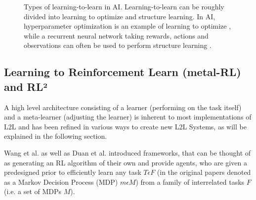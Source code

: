 \documentclass[letterpaper, 10 pt, conference]{ieeeconf}  %
\begin{document}
\begin{figure}[thpb]
        \centering
  \caption{Types of learning-to-learn in AI. Learning-to-learn can be roughly divided into learning to optimize and structure learning.
  In AI, hyperparameter optimization is
  an example of learning to optimize \cite{maclaurinGradientbasedHyperparameterOptimization}, while a 
  recurrent neural network taking rewards, actions and observations
   can often be used to perform structure learning \cite{wangLearningReinforcementLearn2016} \cite{lansdellLearningtolearn2018}.}
        \label{figurelabel}
     \end{figure}


\subsection{Learning to Reinforcement Learn (metal-RL) and RL²}

A high level architecture consisting of a learner (performing on the task itself) and a meta-learner (adjusting the learner) is
inherent to most implementations of L2L \cite{lansdellLearningtolearn2018} and has been refined in various ways to create new L2L Systems, as will be
explained in the following section.

Wang et al.\cite{wangLearningReinforcementLearn2016} as well as Duan et al.\cite{duanRLFastReinforcement2016} introduced 
frameworks, that can be thought of as generating an RL algorithm of their own and
provide agents, who are given a predesigned prior to efficiently learn any task $T \epsilon F$ (in the original papers denoted as 
a Markov Decision Process (MDP) $m \epsilon M$) from a family of interrelated tasks $F$(i.e. a set of MDPs $M$). 
\end{document}
